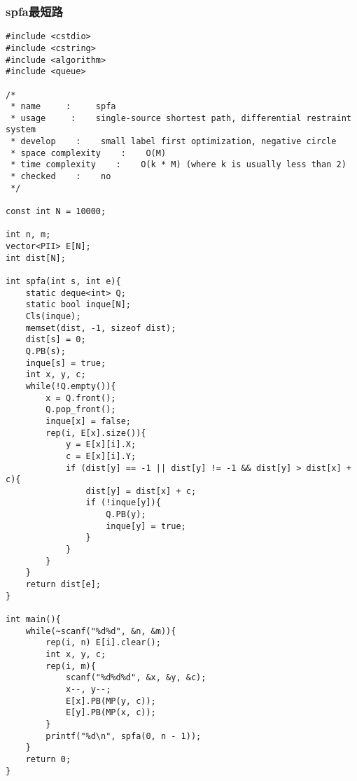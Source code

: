 \subsubsection{spfa最短路}
\begin{verbatim}
#include <cstdio>
#include <cstring>
#include <algorithm>
#include <queue>

/*
 * name     :     spfa
 * usage     :    single-source shortest path, differential restraint system
 * develop    :    small label first optimization, negative circle
 * space complexity    :    O(M)
 * time complexity    :    O(k * M) (where k is usually less than 2)
 * checked    :    no
 */

const int N = 10000;

int n, m;
vector<PII> E[N];
int dist[N];

int spfa(int s, int e){
    static deque<int> Q;
    static bool inque[N];
    Cls(inque);
    memset(dist, -1, sizeof dist);
    dist[s] = 0;
    Q.PB(s);
    inque[s] = true;
    int x, y, c;
    while(!Q.empty()){
        x = Q.front();
        Q.pop_front();
        inque[x] = false;
        rep(i, E[x].size()){
            y = E[x][i].X;
            c = E[x][i].Y;
            if (dist[y] == -1 || dist[y] != -1 && dist[y] > dist[x] + c){
                dist[y] = dist[x] + c;
                if (!inque[y]){
                    Q.PB(y);
                    inque[y] = true;
                }
            }
        }
    }
    return dist[e];
}

int main(){
    while(~scanf("%d%d", &n, &m)){
        rep(i, n) E[i].clear();
        int x, y, c;
        rep(i, m){
            scanf("%d%d%d", &x, &y, &c);
            x--, y--;
            E[x].PB(MP(y, c));
            E[y].PB(MP(x, c));
        }
        printf("%d\n", spfa(0, n - 1));
    }
    return 0;
}
\end{verbatim}
